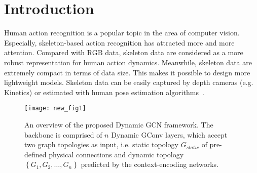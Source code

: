 \documentclass[sigconf]{acmart}
\begin{document}




\maketitle

\section{Introduction}
Human action recognition is a popular topic in the area of computer vision. Especially, skeleton-based action recognition has attracted more and more attention. Compared with RGB data, skeleton data are considered as a more robust representation for human action dynamics. Meanwhile, skeleton data are extremely compact in terms of data size. This makes it possible to design more lightweight models. Skeleton data can be easily captured by depth cameras (e.g. Kinetics) or estimated with human pose estimation algorithms~\cite{chen2018cascaded,wei2016convolutional,cao2018openpose}.

\begin{figure}[t]
\centering
\texttt{[image: new\_fig1]}
\caption{An overview of the proposed Dynamic GCN framework. The backbone is comprised of $n$ Dynamic GConv layers, which accept two graph topologies as input, i.e. static topology $G_{static}$ of pre-defined physical connections and dynamic topology $\left\{ G_1, G_2, \dots, G_n \right\}$ predicted by the context-encoding networks.}
\label{fig1}
\end{figure}
\end{document}
